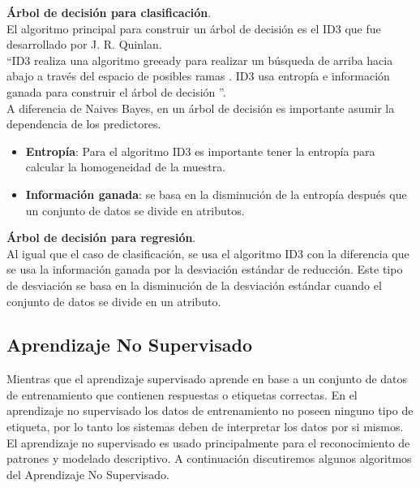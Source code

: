 \textbf{Árbol de decisión para clasificación}.\\
El algoritmo principal para construir un árbol de decisión es el ID3 que fue desarrollado por J. R. Quinlan.\\ \textquotedblleft ID3 realiza una algoritmo greeady para realizar un búsqueda de arriba hacia abajo a través del espacio de posibles ramas . ID3 usa entropía e información ganada para construir el árbol de decisión \textquotedblright.\\ A diferencia de Naives Bayes, en un árbol de decisión es importante asumir la dependencia de los predictores.\\
\begin{itemize}
	\item \textbf{Entropía}: Para el algoritmo ID3 es importante tener la entropía para calcular la homogeneidad de la muestra.
	\item \textbf{Información ganada}: se basa en la disminución de la entropía después que un conjunto de datos se divide en atributos.
\end{itemize}

\textbf{Árbol de decisión para regresión}.\\
Al igual que el caso de clasificación, se usa el algoritmo ID3 con la diferencia que se usa la información ganada por la desviación estándar de reducción. Este tipo de desviación se basa en la disminución de la desviación estándar cuando el conjunto de datos se divide en un atributo.

\subsection{Aprendizaje No Supervisado}
Mientras que el aprendizaje supervisado aprende en base a un conjunto de datos de entrenamiento que contienen respuestas o etiquetas correctas. En el aprendizaje no supervisado los datos de entrenamiento no poseen ninguno tipo de etiqueta, por lo tanto los sistemas deben de interpretar los datos por si mismos.
El aprendizaje no supervisado es usado principalmente para el reconocimiento de patrones y modelado descriptivo.
A continuación discutiremos algunos algoritmos del Aprendizaje No Supervisado.
